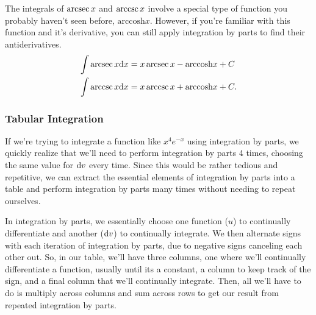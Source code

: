 \noindent
The integrals of $\operatorname{arcsec}{x}$ and $\operatorname{arccsc}{x}$ involve a special type of function you probably haven't seen before, $\text{arccosh}{x}$.
However, if you're familiar with this function and it's derivative, you can still apply integration by parts to find their antiderivatives.
\begin{align*}
	\int{\operatorname{arcsec}{x}\mathrm{d} x} &= x\operatorname{arcsec}{x} - \text{arccosh}{x} + C \\
	\int{\operatorname{arccsc}{x}\mathrm{d} x} &= x\operatorname{arccsc}{x} + \text{arccosh}{x} + C.
\end{align*}

\subsubsection{Tabular Integration}
If we're trying to integrate a function like $x^4e^{-x}$ using integration by parts, we quickly realize that we'll need to perform integration by parts 4 times, choosing the same value for $\mathrm{d} v$ every time.
Since this would be rather tedious and repetitive, we can extract the essential elements of integration by parts into a table and perform integration by parts many times without needing to repeat ourselves.

\noindent
In integration by parts, we essentially choose one function ($u$) to continually differentiate and another ($\mathrm{d} v$) to continually integrate.
We then alternate signs with each iteration of integration by parts, due to negative signs canceling each other out.
So, in our table, we'll have three columns, one where we'll continually differentiate a function, usually until its a constant, a column to keep track of the sign, and a final column that we'll continually integrate.
Then, all we'll have to do is multiply across columns and sum across rows to get our result from repeated integration by parts.

